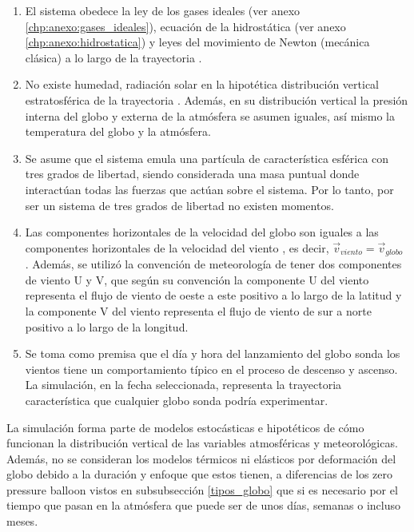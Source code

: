 \begin{enumerate}
    \item  El sistema obedece la ley de los gases ideales (ver
anexo \ref{chp:anexo:gases_ideales}), ecuación de la hidrostática (ver anexo \ref{chp:anexo:hidrostatica}) y leyes del movimiento de Newton (mecánica clásica) a lo largo de la trayectoria \cite{libro_dinamica_beer}. 
    \item No existe humedad, radiación solar en la hipotética distribución vertical estratosférica de la trayectoria \cite{isa_1976}. Además, en su distribución vertical la presión interna del globo y externa de la atmósfera se asumen iguales, así mismo la temperatura del globo y la atmósfera. 
    \item Se asume que el sistema emula una partícula de característica esférica con tres grados de libertad, siendo considerada una masa puntual donde interactúan todas las fuerzas que actúan sobre el sistema. Por lo tanto,  por ser un sistema de tres grados de libertad no existen momentos.
    \item  Las componentes horizontales de la velocidad del globo son iguales a las componentes horizontales de la velocidad del viento \cite{lsoda, simulador_chino}, es decir, $\vec{v}_{viento} = \vec{v}_{globo} $ .  Además, se utilizó la convención de meteorología de tener dos componentes de viento U y V, que según su convención la componente U del viento representa el flujo de viento de oeste a este positivo a lo largo de la latitud y la componente V del viento representa el flujo de viento de sur a norte positivo a lo largo de la longitud.
    \item Se toma como premisa que el día y hora del lanzamiento del globo sonda los vientos tiene un comportamiento típico en el proceso de descenso y ascenso. La simulación, en la fecha seleccionada, representa la trayectoria característica que cualquier globo sonda podría experimentar.
\end{enumerate}

\vspace{0.7cm}

La simulación forma parte de modelos estocásticas e hipotéticos de cómo funcionan la distribución vertical de las variables atmosféricas y meteorológicas. Además, no se consideran los modelos térmicos ni elásticos por deformación del globo debido a la duración y enfoque que estos tienen, a diferencias de los zero pressure balloon vistos en subsubsección \ref{tipos_globo} que si es necesario por el tiempo que pasan en la atmósfera que puede ser de unos días, semanas o incluso meses.


